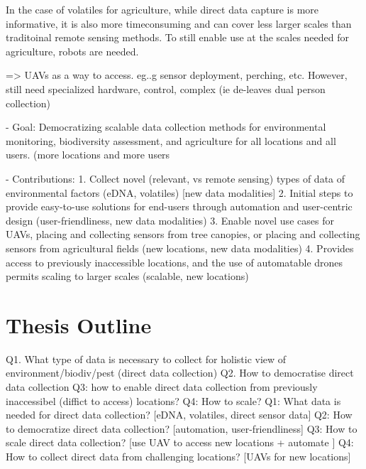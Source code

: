 In the case of volatiles for agriculture, while direct data capture is more informative, it is also more timeconsuming and can cover less larger scales than traditoinal remote sensing methods. To still enable use at the scales needed for agriculture, robots are needed.

=> UAVs as a way to access. eg..g sensor deployment, perching, etc.
However, still need specialized hardware, control, complex (ie de-leaves dual person collection)

- Goal: Democratizing scalable data collection methods for environmental monitoring, biodiversity assessment, and agriculture for all locations and all users. (more locations and more users

- Contributions:
1. Collect novel (relevant, vs remote sensing) types of data of environmental factors (eDNA, volatiles) [new data modalities]
2. Initial steps to provide easy-to-use solutions for end-users through automation and user-centric design  (user-friendliness, new data modalities)
3. Enable novel use cases for UAVs, placing and collecting sensors from tree canopies, or placing and collecting sensors from agricultural fields (new locations, new data modalities)
4. Provides access to previously inaccessible locations, and the use of automatable drones permits scaling to larger scales (scalable, new locations)

\section{Thesis Outline}
Q1. What type of data is necessary to collect for holistic view of environment/biodiv/pest (direct data collection)
Q2. How to democratise direct data collection
Q3: how to enable direct data collection from previously inaccessibel (diffict to access) locations?
Q4: How to scale?
Q1: What data is needed for direct data collection? [eDNA, volatiles, direct sensor data]
Q2: How to democratize direct data collection? [automation, user-friendliness]
Q3: How to scale direct data collection? [use UAV to access new locations + automate ]
Q4: How to collect direct data from challenging locations? [UAVs for new locations]

